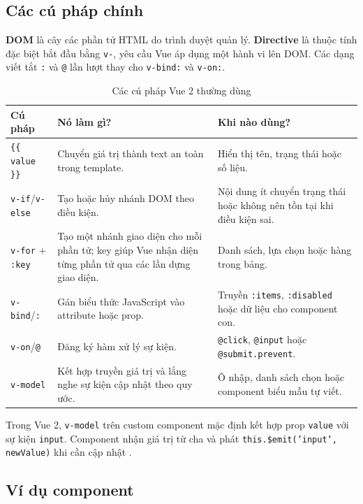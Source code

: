 \subsection{Các cú pháp chính}

\textbf{DOM} là cây các phần tử HTML do trình duyệt quản lý. \textbf{Directive} là
thuộc tính đặc biệt bắt đầu bằng \texttt{v-}, yêu cầu Vue áp dụng một hành vi lên
DOM. Các dạng viết tắt \texttt{:} và \texttt{@} lần lượt thay
cho \texttt{v-bind:} và \texttt{v-on:}.

{\small
\begin{longtable}{|>{\raggedright\arraybackslash}p{}|
                  >{\raggedright\arraybackslash}p{}|
                  >{\raggedright\arraybackslash}p{}|}
\caption{Các cú pháp Vue 2 thường dùng}\label{tab:vue-syntax}\\
\hline
\textbf{Cú pháp} & \textbf{Nó làm gì?} & \textbf{Khi nào dùng?} \\
\hline
\texttt{\{\{ value \}\}} & Chuyển giá trị thành text an toàn trong template. & Hiển thị tên, trạng thái hoặc số liệu. \\
\hline
\texttt{v-if}/\texttt{v-else} & Tạo hoặc hủy nhánh DOM theo điều kiện. & Nội dung ít chuyển trạng thái hoặc không nên tồn tại khi điều kiện sai. \\
\hline
\texttt{v-for} + \texttt{:key} & Tạo một nhánh giao diện cho mỗi phần tử; key giúp Vue nhận diện từng phần tử qua các lần dựng giao diện. & Danh sách, lựa chọn hoặc hàng trong bảng. \\
\hline
\texttt{v-bind}/\texttt{:} & Gán biểu thức JavaScript vào attribute hoặc prop. & Truyền \texttt{:items}, \texttt{:disabled} hoặc dữ liệu cho component con. \\
\hline
\texttt{v-on}/\texttt{@} & Đăng ký hàm xử lý sự kiện. & \texttt{@click}, \texttt{@input} hoặc \texttt{@submit.prevent}. \\
\hline
\texttt{v-model} & Kết hợp truyền giá trị và lắng nghe sự kiện cập nhật theo quy ước. & Ô nhập, danh sách chọn hoặc component biểu mẫu tự viết. \\
\hline
\end{longtable}
}

Trong Vue 2, \texttt{v-model} trên custom component mặc định kết hợp prop
\texttt{value} với sự kiện \texttt{input}. Component nhận giá trị từ cha và phát
\texttt{this.\$emit('input', newValue)} khi cần cập nhật
\cite{vue2-template,vue2-components}.

\subsection{Ví dụ component}


